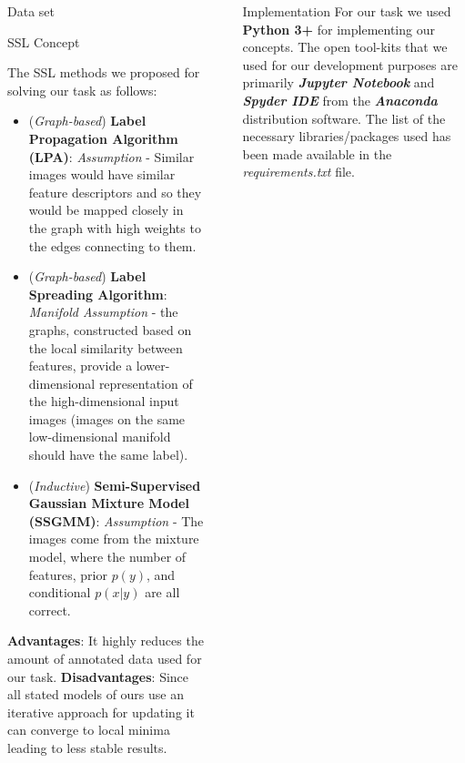 \documentclass[final]{beamer}
\newlength{\sepwidth}
\newlength{\colwidth}
\newcommand{\separatorcolumn}{\begin{column}{\sepwidth}\end{column}}
\begin{document}
\begin{frame}[t]
\begin{columns}[t]
\begin{column}{\colwidth}
\begin{block}{Data set}
  \end{block}

  \begin{alertblock}{SSL Concept}

    The SSL methods we proposed for solving our task as follows:
    \begin{itemize}
        \item (\textit{Graph-based}) \textbf{Label Propagation Algorithm (LPA)}: \textit{Assumption} - Similar images would have similar feature descriptors and so they would be mapped closely in the graph with high weights to the edges connecting to them.
        \item (\textit{Graph-based}) \textbf{Label Spreading Algorithm}:  \textit{Manifold Assumption} - the graphs, constructed based on the local similarity between features, provide a lower-dimensional representation of the high-dimensional input images (images on the same low-dimensional manifold should have the same label).
        \item (\textit{Inductive}) \textbf{Semi-Supervised Gaussian Mixture Model (SSGMM)}: \textit{Assumption} - The images come from the mixture model, where the number of features, prior $p(y)$, and conditional $p(x|y)$ are all correct.
    \end{itemize}

    
    \textbf{Advantages}: It highly reduces the amount of annotated data used for our task.\newline
    \textbf{Disadvantages}: Since all stated models of ours use an iterative approach for updating it can converge to local minima leading to less stable results.
    

  \end{alertblock}

\end{column}

\separatorcolumn

\begin{column}{\colwidth}

  \begin{block}{Implementation}
    For our task we used \textbf{Python 3+} for implementing our concepts. The open tool-kits that we used for our development purposes are primarily \textit{\textbf{Jupyter Notebook}} and \textit{\textbf{Spyder IDE}} from the \textbf{\textit{Anaconda}} distribution software. The list of the necessary libraries/packages used  has been made available in the \textit{requirements.txt} file. 


\end{block}
\end{column}
\end{columns}
\end{frame}
\end{document}
